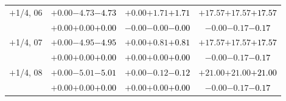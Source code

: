\documentclass[compress]{beamer}
\begin{document}
\begin{frame}
\begin{tabular}{r | c | c | c}
$+$1/4, 06 & $+0.00$\hspace{0.1 cm}$-4.73$\hspace{0.1 cm}\textcolor{black}{$-4.73$} & $+0.00$\hspace{0.1 cm}$+1.71$\hspace{0.1 cm}\textcolor{black}{$+1.71$} & $+17.57$\hspace{0.1 cm}$+17.57$\hspace{0.1 cm}\textcolor{black}{$+17.57$} \\
           & $+0.00$\hspace{0.1 cm}$+0.00$\hspace{0.1 cm}\textcolor{black}{$+0.00$} & $-0.00$\hspace{0.1 cm}$-0.00$\hspace{0.1 cm}\textcolor{black}{$-0.00$} & $-0.00$\hspace{0.1 cm}$-0.17$\hspace{0.1 cm}\textcolor{black}{$-0.17$} \\
$+$1/4, 07 & $+0.00$\hspace{0.1 cm}$-4.95$\hspace{0.1 cm}\textcolor{black}{$-4.95$} & $+0.00$\hspace{0.1 cm}$+0.81$\hspace{0.1 cm}\textcolor{black}{$+0.81$} & $+17.57$\hspace{0.1 cm}$+17.57$\hspace{0.1 cm}\textcolor{black}{$+17.57$} \\
           & $+0.00$\hspace{0.1 cm}$+0.00$\hspace{0.1 cm}\textcolor{black}{$+0.00$} & $+0.00$\hspace{0.1 cm}$+0.00$\hspace{0.1 cm}\textcolor{black}{$+0.00$} & $-0.00$\hspace{0.1 cm}$-0.17$\hspace{0.1 cm}\textcolor{black}{$-0.17$} \\
$+$1/4, 08 & $+0.00$\hspace{0.1 cm}$-5.01$\hspace{0.1 cm}\textcolor{black}{$-5.01$} & $+0.00$\hspace{0.1 cm}$-0.12$\hspace{0.1 cm}\textcolor{black}{$-0.12$} & $+21.00$\hspace{0.1 cm}$+21.00$\hspace{0.1 cm}\textcolor{black}{$+21.00$} \\
           & $+0.00$\hspace{0.1 cm}$+0.00$\hspace{0.1 cm}\textcolor{black}{$+0.00$} & $+0.00$\hspace{0.1 cm}$+0.00$\hspace{0.1 cm}\textcolor{black}{$+0.00$} & $-0.00$\hspace{0.1 cm}$-0.17$\hspace{0.1 cm}\textcolor{black}{$-0.17$} \\

\end{tabular}
\end{frame}
\end{document}

